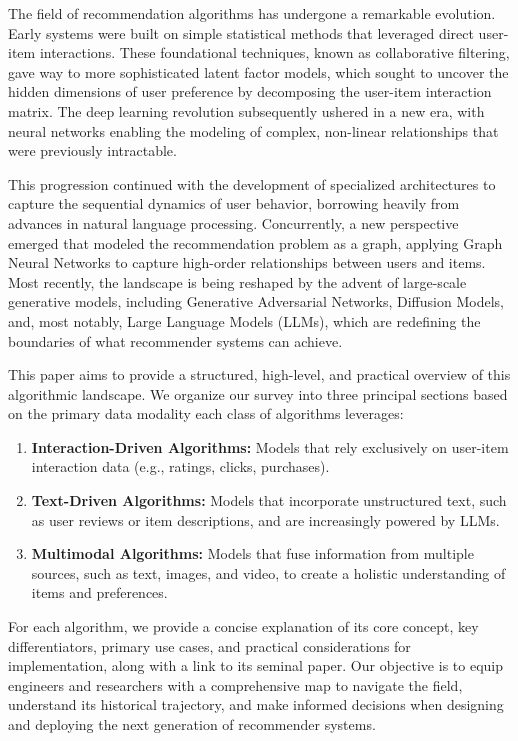 \documentclass{article}
\begin{document}
    The field of recommendation algorithms has undergone a remarkable evolution. Early systems were built on simple statistical methods that leveraged direct user-item interactions. These foundational techniques, known as collaborative filtering, gave way to more sophisticated latent factor models, which sought to uncover the hidden dimensions of user preference by decomposing the user-item interaction matrix. The deep learning revolution subsequently ushered in a new era, with neural networks enabling the modeling of complex, non-linear relationships that were previously intractable.

    This progression continued with the development of specialized architectures to capture the sequential dynamics of user behavior, borrowing heavily from advances in natural language processing. Concurrently, a new perspective emerged that modeled the recommendation problem as a graph, applying Graph Neural Networks to capture high-order relationships between users and items. Most recently, the landscape is being reshaped by the advent of large-scale generative models, including Generative Adversarial Networks, Diffusion Models, and, most notably, Large Language Models (LLMs), which are redefining the boundaries of what recommender systems can achieve.

    This paper aims to provide a structured, high-level, and practical overview of this algorithmic landscape. We organize our survey into three principal sections based on the primary data modality each class of algorithms leverages:
    \begin{enumerate}
        \item \textbf{Interaction-Driven Algorithms:} Models that rely exclusively on user-item interaction data (e.g., ratings, clicks, purchases).
        \item \textbf{Text-Driven Algorithms:} Models that incorporate unstructured text, such as user reviews or item descriptions, and are increasingly powered by LLMs.
        \item \textbf{Multimodal Algorithms:} Models that fuse information from multiple sources, such as text, images, and video, to create a holistic understanding of items and preferences.
    \end{enumerate}
    For each algorithm, we provide a concise explanation of its core concept, key differentiators, primary use cases, and practical considerations for implementation, along with a link to its seminal paper. Our objective is to equip engineers and researchers with a comprehensive map to navigate the field, understand its historical trajectory, and make informed decisions when designing and deploying the next generation of recommender systems.
\end{document}
